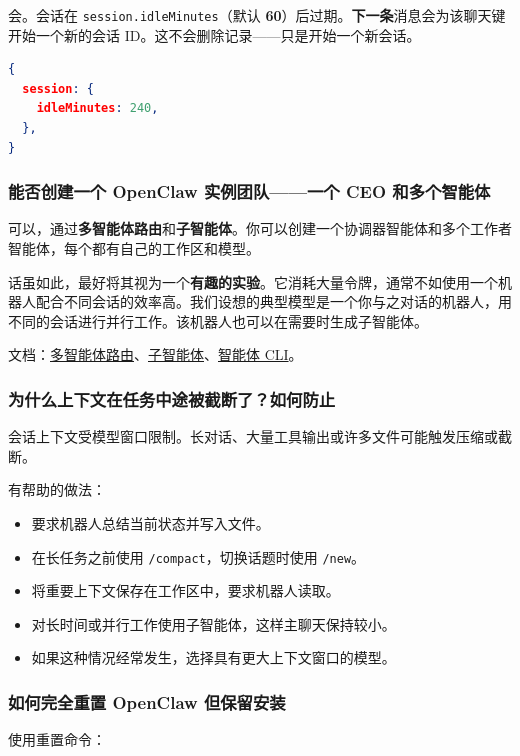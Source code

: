 会。会话在 \texttt{session.idleMinutes}（默认 \textbf{60}）后过期。\textbf{下一条}消息会为该聊天键开始一个新的会话 ID。这不会删除记录——只是开始一个新会话。

\begin{lstlisting}[language=json]
{
  session: {
    idleMinutes: 240,
  },
}
\end{lstlisting}


\subsubsection{能否创建一个 OpenClaw 实例团队——一个 CEO 和多个智能体}


可以，通过\textbf{多智能体路由}和\textbf{子智能体}。你可以创建一个协调器智能体和多个工作者智能体，每个都有自己的工作区和模型。

话虽如此，最好将其视为一个\textbf{有趣的实验}。它消耗大量令牌，通常不如使用一个机器人配合不同会话的效率高。我们设想的典型模型是一个你与之对话的机器人，用不同的会话进行并行工作。该机器人也可以在需要时生成子智能体。

文档：\href{/concepts/multi-agent}{多智能体路由}、\href{/tools/subagents}{子智能体}、\href{/cli/agents}{智能体 CLI}。

\subsubsection{为什么上下文在任务中途被截断了？如何防止}


会话上下文受模型窗口限制。长对话、大量工具输出或许多文件可能触发压缩或截断。

有帮助的做法：

\begin{itemize}
  \item 要求机器人总结当前状态并写入文件。
  \item 在长任务之前使用 \texttt{/compact}，切换话题时使用 \texttt{/new}。
  \item 将重要上下文保存在工作区中，要求机器人读取。
  \item 对长时间或并行工作使用子智能体，这样主聊天保持较小。
  \item 如果这种情况经常发生，选择具有更大上下文窗口的模型。
\end{itemize}


\subsubsection{如何完全重置 OpenClaw 但保留安装}


使用重置命令：

